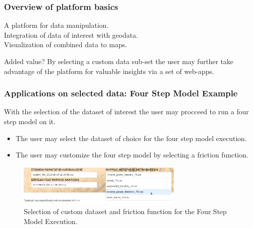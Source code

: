\documentclass{beamer}
\begin{document}
    \begin{frame}
    \frametitle{Overview of platform basics}
    \checkmark A platform for data manipulation.\\
    \checkmark Integration of data of interest with geodata.\\
    \checkmark Visualization of combined data to maps.
    \pause
    \begin{alertblock}{Added value?}
    By selecting a custom data sub-set the user may further take advantage of the platform for valuable insights via a set of web-apps.
    \end{alertblock}
    \end{frame}
    
    \begin{frame}
    \frametitle{Applications on selected data: Four Step Model Example}
    With the selection of the dataset of interest the user may procceed to run a four step model on it.
    \begin{itemize}
    	\item The user may select the dataset of choice for the four step model execution.
    	\item The user may customize the four step model by selecting a friction function.
    \end{itemize}
    
    \begin{figure}[h]
    \centering
    \includegraphics[width=8cm, height=2cm]{12_4sm_filters}
    \caption{Selection of custom dataset and friction function for the Four Step Model Execution.}
    \label{fig:4sm_filters}
    \end{figure}
    
    \end{frame}
    
\end{document}
